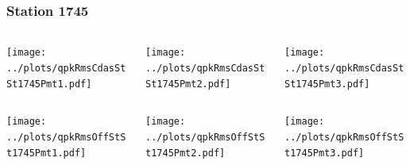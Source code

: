 \documentclass[aspectratio=169]{beamer}
\begin{document}
\begin{frame} 
  \frametitle{Station 1745}
  \begin{center}
    \begin{columns}
      \begin{column}{0.33\textwidth}
        \texttt{[image: ../plots/qpkRmsCdasStSt1745Pmt1.pdf]}
      \end{column}
      \begin{column}{0.33\textwidth}
        \texttt{[image: ../plots/qpkRmsCdasStSt1745Pmt2.pdf]}
      \end{column}
      \begin{column}{0.33\textwidth}
        \texttt{[image: ../plots/qpkRmsCdasStSt1745Pmt3.pdf]}
      \end{column}
    \end{columns}
  \end{center}

  \begin{center}
    \begin{columns}
      \begin{column}{0.33\textwidth}
        \texttt{[image: ../plots/qpkRmsOffStSt1745Pmt1.pdf]}
      \end{column}
      \begin{column}{0.33\textwidth}
        \texttt{[image: ../plots/qpkRmsOffStSt1745Pmt2.pdf]}
      \end{column}
      \begin{column}{0.33\textwidth}
        \texttt{[image: ../plots/qpkRmsOffStSt1745Pmt3.pdf]}
      \end{column}
    \end{columns}
  \end{center}
\end{frame}
\end{document}
